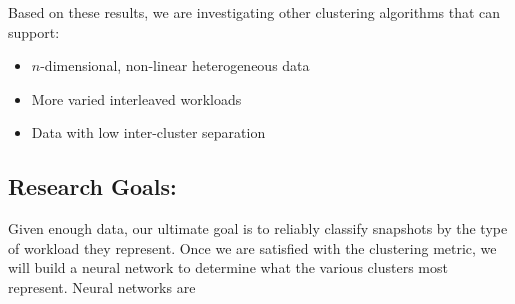 
Based on these results, we
are investigating other clustering algorithms that can support:

\begin{itemize}
\item $n$-dimensional, non-linear heterogeneous data
\item More varied interleaved workloads
\item Data with low inter-cluster separation
\end{itemize}


\subsection*{Research Goals: }
Given enough data, our ultimate goal is to reliably classify snapshots
by the type of workload they represent.  Once we are satisfied with the clustering metric, we will build a neural network to determine what \mws the various clusters most represent. 
Neural networks are %

